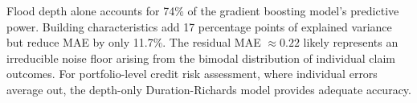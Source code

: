 Flood depth alone accounts for 74\% of the gradient boosting model's predictive power. Building characteristics add 17 percentage points of explained variance but reduce MAE by only 11.7\%. The residual MAE $\approx 0.22$ likely represents an irreducible noise floor arising from the bimodal distribution of individual claim outcomes. For portfolio-level credit risk assessment, where individual errors average out, the depth-only Duration-Richards model provides adequate accuracy.
